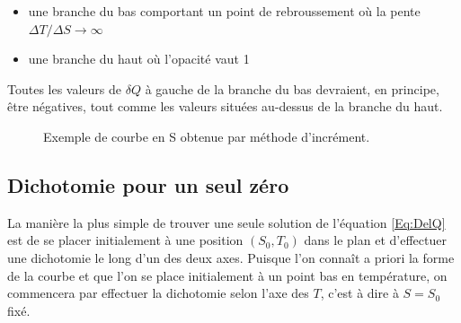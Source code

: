 \documentclass[a4paper,12pt]{article}
\begin{document}
        \begin{itemize}
          \item une branche du bas comportant un point de rebroussement où la pente $\Delta T / \Delta S \rightarrow \infty$
          \item une branche du haut où l'opacité vaut 1
        \end{itemize}
        
        Toutes les valeurs de $\delta Q$ à gauche de la branche du bas devraient, en principe, être négatives, tout comme les valeurs situées au-dessus de la branche du haut.

    \begin{figure}
      \hspace{5pt}
      \caption{Exemple de courbe en S obtenue par méthode d'incrément.}
      \label{Fig:sCurveExample}
    \end{figure}

    \subsection{Dichotomie pour un seul zéro}
        \label{Sec:Dicho_Un_Zero}
        La manière la plus simple de trouver une seule solution de l'équation \ref{Eq:DelQ} est de se placer initialement à une position $(S_0 , T_0)$ dans le plan et d'effectuer une dichotomie le long d'un des deux axes. Puisque l'on connaît a priori la forme de la courbe et que l'on se place initialement à un point bas en température, on commencera par effectuer la dichotomie selon l'axe des $T$, c'est à dire à $S=S_0$ fixé.\newline
\end{document}
